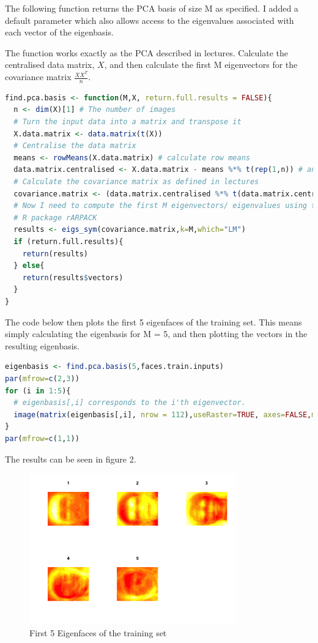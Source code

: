 \documentclass[12pt]{article}
\begin{document}
The following function returns the PCA basis of size M as specified. I added a default parameter which also allows access to the eigenvalues associated with each vector of the eigenbasis.

The function works exactly as the PCA described in lectures. Calculate the centralised data matrix, $X$, and then calculate the first M eigenvectors for the covariance matrix $\frac{XX^{T}}{n}$.

\begin{lstlisting}[linewidth=18.4cm,language=R]
find.pca.basis <- function(M,X, return.full.results = FALSE){
  n <- dim(X)[1] # The number of images
  # Turn the input data into a matrix and transpose it
  X.data.matrix <- data.matrix(t(X))
  # Centralise the data matrix
  means <- rowMeans(X.data.matrix) # calculate row means
  data.matrix.centralised <- X.data.matrix - means %*% t(rep(1,n)) # and subtract
  # Calculate the covariance matrix as defined in lectures
  covariance.matrix <- (data.matrix.centralised %*% t(data.matrix.centralised)) / n
  # Now I need to compute the first M eigenvectors/ eigenvalues using the 
  # R package rARPACK
  results <- eigs_sym(covariance.matrix,k=M,which="LM")
  if (return.full.results){
    return(results)
  } else{
    return(results$vectors)
  }
}
\end{lstlisting}

The code below then plots the first 5 eigenfaces of the training set. This means simply calculating the eigenbasis for M = 5, and then plotting the vectors in the resulting eigenbasis.
\begin{lstlisting}[linewidth=18.4cm,language=R]
eigenbasis <- find.pca.basis(5,faces.train.inputs)
par(mfrow=c(2,3))
for (i in 1:5){
  # eigenbasis[,i] corresponds to the i'th eigenvector.
  image(matrix(eigenbasis[,i], nrow = 112),useRaster=TRUE, axes=FALSE,main=i)
}
par(mfrow=c(1,1))
\end{lstlisting}

The results can be seen in figure 2.

\begin{figure}
\caption{First 5 Eigenfaces of the  training set}
\centering
\includegraphics[width=0.8\textwidth]{eigenface}
\end{figure}
\end{document}

